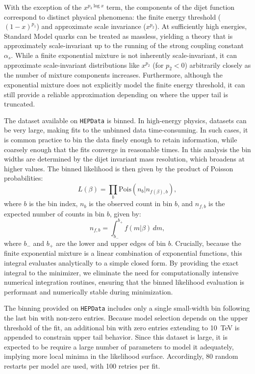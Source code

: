 \documentclass[a4paper,11pt]{article}
\begin{document}
With the exception of the $x^{p_3\log x}$ term, the components of the dijet function correspond to distinct physical phenomena: the finite energy threshold ($(1-x)^{p_1}$) and approximate scale invariance ($x^{p_2}$). At sufficiently high energies, Standard Model quarks can be treated as massless, yielding a theory that is approximately scale-invariant up to the running of the strong coupling constant $\alpha_s$. While a finite exponential mixture is not inherently scale-invariant, it can approximate scale-invariant distributions like $x^{p_2}$ (for $p_2<0$) arbitrarily closely as the number of mixture components increases. Furthermore, although the exponential mixture does not explicitly model the finite energy threshold, it can still provide a reliable approximation depending on where the upper tail is truncated.

The dataset available on \texttt{HEPData} is binned. In high-energy physics, datasets can be very large, making fits to the unbinned data time-consuming. In such cases, it is common practice to bin the data finely enough to retain information, while coarsely enough that the fits converge in reasonable times.
In this analysis the bin widths are determined by the dijet invariant mass resolution, which broadens at higher 
values.
The binned likelihood is then given by the product of Poisson probabilities:
\begin{equation}
    L(\beta) = \prod_b \text{Pois}(n_b|n_{f(\beta),b}),
\end{equation}
where $b$ is the bin index, $n_b$ is the observed count in bin $b$, and $n_{f,b}$ is the 
expected number of counts in bin $b$, given by:
\begin{equation}
    n_{f,b} = \int_{b_-}^{b_+} f(m|\beta)\,dm,
\end{equation}
where $b_-$ and $b_+$ are the lower and upper edges of bin $b$. Crucially, because the finite exponential mixture is a linear combination of exponential functions, this integral evaluates analytically to a simple closed form. By providing the exact integral to the minimizer, we eliminate the need for computationally intensive numerical integration routines, ensuring that the binned likelihood evaluation is performant and numerically stable during minimization.

The binning provided on \texttt{HEPData} includes only a single small-width bin following the 
last bin with non-zero entries.
Because model selection depends on the upper threshold of the fit, an additional bin with zero 
entries extending to 10~TeV is appended to constrain upper tail behavior.
Since this dataset is large, it is expected to be require a large number of parameters to model it 
adequately, implying more local minima in the likelihood surface.
Accordingly, 80 random restarts per model are used, with 100 retries per fit.
\end{document}
